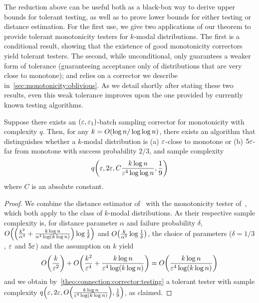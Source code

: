 The reduction above can be useful both as a black-box 
way to derive upper bounds for tolerant testing, 
as well as to prove lower bounds for either testing or distance estimation. 
For the first use, we give two applications of 
our theorem to provide tolerant monotonicity testers for $k$-modal distributions. 
The first is a conditional result, 
showing that the existence of
good monotonicity correctors yield tolerant testers. The second, 
while unconditional, only guarantees a weaker form of tolerance
(guaranteeing acceptance only of distributions that are very close to monotone); 
and relies on a corrector we describe in~\autoref{sec:monotonicity:oblivious}. 
As we detail shortly after stating these two results, 
even this weak tolerance improves upon the one provided by currently 
known testing algorithms.


\begin{corollary}\label{coro:connection:corrector:testing}
Suppose there exists an $(\varepsilon,\varepsilon_1)$-batch sampling corrector for monotonicity with complexity $q$. Then, for any $k=\bigO{\log n/\log\log n}$, there exists an algorithm that distinguishes whether a $k$-modal distribution is  \textsf{(a)} $\varepsilon$-close to monotone or  \textsf{(b)} $5\varepsilon$-far from monotone with success probability $2/3$, and sample complexity
\[
	q\!\left( \varepsilon, 2\varepsilon, C\frac{k\log n}{\varepsilon^4\log\log n}, \frac{1}{9}  \right)
\]
where $C$ is an absolute constant.
\end{corollary}
\begin{proof}
 We combine the distance estimator of~\cite{DDSVV:13} with the monotonicity tester of~\cite[Section 3.4]{DDS:12}, which both apply to  the class of $k$-modal distributions. As their respective sample complexity is, for distance parameter $\alpha$ and failure probability $\delta$, $\bigO{\left(\frac{k^2}{\alpha^4}+\frac{k\log n}{\alpha^4\log(k\log n)}\right)\log\frac{1}{\delta}}$ and $\bigO{\frac{k}{\alpha^2}\log\frac{1}{\delta}}$, the choice of parameters ($\delta=1/3$, $\varepsilon$ and $5\varepsilon$) and the assumption on $k$ yield
 \[
   \bigO{\frac{k}{\eps^2}} + \bigO{\frac{k^2}{\eps^4}+\frac{k\log n}{\eps^4\log(k\log n)} }
   = \bigO{\frac{k\log n}{\eps^4\log(k\log n)}}
 \]
  and we obtain by~\autoref{theo:connection:corrector:testing} a tolerant tester with sample complexity $q\!\left( \eps, 2\eps, \bigO{\frac{k\log n}{\eps^4\log(k\log n)}}, \frac{1}{9}  \right)$, as claimed.
\end{proof}

